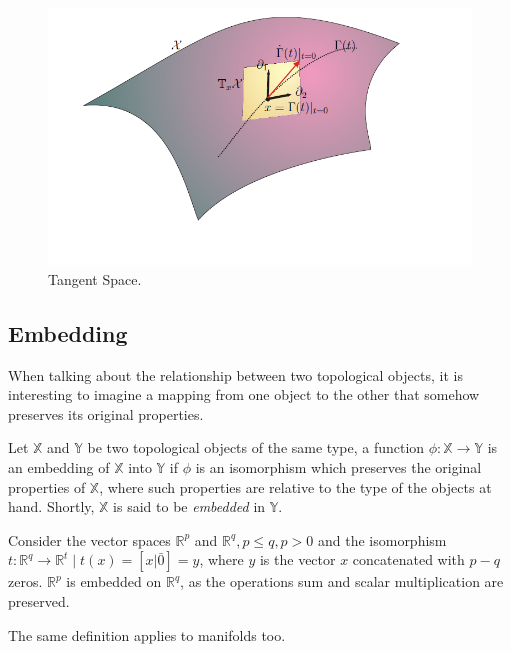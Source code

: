 \begin{figure}[ht]
\begin{center}
\includegraphics[width=\textwidth]{./Figures/tangent.png}
\caption{Tangent Space.\citep{Ety2008}}
\label{tangent}
\end{center}
\end{figure}

\subsection{Embedding}

When talking about the relationship between two topological objects, it is interesting to imagine a mapping from one object to the other that somehow preserves its original properties.

Let $\mathbb{X}$ and $\mathbb{Y}$ be two topological objects of the same type, a function $\phi \colon \mathbb{X} \to \mathbb{Y}$ is an embedding of $\mathbb{X}$ into $\mathbb{Y}$ if $\phi$ is an isomorphism which preserves the original properties of $\mathbb{X}$, where such properties are relative to the type of the objects at hand. Shortly, $\mathbb{X}$ is said to be \textit{embedded} in $\mathbb{Y}$.

\begin{example}
	Consider the vector spaces $\mathbb{R}^p$ and $\mathbb{R}^q, p \leq q, p > 0$ and the isomorphism $t \colon \mathbb{R}^q \to \mathbb{R}^t \mid t(x) = [x | \bar{0}] = y$, where $y$ is the vector $x$ concatenated with $p-q$ zeros. $\mathbb{R}^p$ is embedded on $\mathbb{R}^q$, as the operations sum and scalar multiplication are preserved.
\end{example}

The same definition applies to manifolds too.